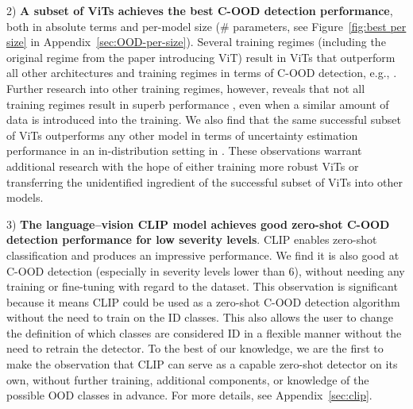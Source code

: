 \documentclass[table]{article} \usepackage{PRIMEarxiv}
\begin{document}
2) \textbf{A subset of ViTs achieves the best C-OOD detection performance}, both in absolute terms and per-model size (\# parameters, see Figure~\ref{fig:best per size} in Appendix~\ref{sec:OOD-per-size}).
Several training regimes (including the original regime from the paper introducing ViT) result in ViTs that outperform all other architectures and training regimes in terms of C-OOD detection, e.g., \citet{DBLP:conf/iclr/DosovitskiyB0WZ21, steinerhow, DBLP:conf/iclr/ChenHG22, DBLP:conf/nips/RidnikBNZ21}.
Further research into other training regimes, however, reveals that not all training regimes result in superb performance \citep{DBLP:conf/icml/TouvronCDMSJ21, DBLP:journals/corr/abs-2204-07118, DBLP:journals/corr/abs-2201-08371, NEURIPS2019_9015}, even when a similar amount of data is introduced into the training. 
We also find that the same successful subset of ViTs outperforms any other model in terms of uncertainty estimation performance in an in-distribution setting in \citet{galil2023what}.
These observations warrant additional research with the hope of either training more robust ViTs or transferring the 
unidentified ingredient of the successful subset of ViTs into other models.

3) \textbf{The language--vision CLIP model achieves good zero-shot C-OOD detection performance for low severity levels}.
CLIP \citep{DBLP:conf/icml/RadfordKHRGASAM21} enables zero-shot classification and produces an impressive performance. We find it is also good at C-OOD detection (especially in severity levels lower than 6), without needing any training or fine-tuning with regard to the dataset. This observation is significant because it means CLIP could be used as a zero-shot C-OOD detection algorithm without the need to train on the ID classes. This also allows the user to change the definition of which classes are considered ID in a flexible manner without the need to retrain the detector. To the best of our knowledge, we are the first to make the observation that CLIP can serve as a capable zero-shot detector on its own, without further training, additional components, or knowledge of the possible OOD classes in advance. For more details, see Appendix~\ref{sec:clip}.
\end{document}
